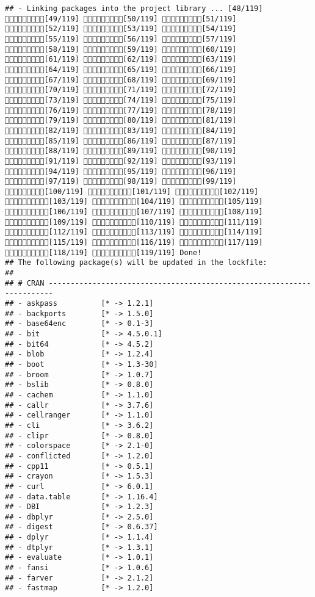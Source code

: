 \documentclass[
]{article}
\begin{document}
\begin{verbatim}
## - Linking packages into the project library ... [48/119] [49/119] [50/119] [51/119] [52/119] [53/119] [54/119] [55/119] [56/119] [57/119] [58/119] [59/119] [60/119] [61/119] [62/119] [63/119] [64/119] [65/119] [66/119] [67/119] [68/119] [69/119] [70/119] [71/119] [72/119] [73/119] [74/119] [75/119] [76/119] [77/119] [78/119] [79/119] [80/119] [81/119] [82/119] [83/119] [84/119] [85/119] [86/119] [87/119] [88/119] [89/119] [90/119] [91/119] [92/119] [93/119] [94/119] [95/119] [96/119] [97/119] [98/119] [99/119] [100/119] [101/119] [102/119] [103/119] [104/119] [105/119] [106/119] [107/119] [108/119] [109/119] [110/119] [111/119] [112/119] [113/119] [114/119] [115/119] [116/119] [117/119] [118/119] [119/119] Done!
## The following package(s) will be updated in the lockfile:
## 
## # CRAN -----------------------------------------------------------------------
## - askpass          [* -> 1.2.1]
## - backports        [* -> 1.5.0]
## - base64enc        [* -> 0.1-3]
## - bit              [* -> 4.5.0.1]
## - bit64            [* -> 4.5.2]
## - blob             [* -> 1.2.4]
## - boot             [* -> 1.3-30]
## - broom            [* -> 1.0.7]
## - bslib            [* -> 0.8.0]
## - cachem           [* -> 1.1.0]
## - callr            [* -> 3.7.6]
## - cellranger       [* -> 1.1.0]
## - cli              [* -> 3.6.2]
## - clipr            [* -> 0.8.0]
## - colorspace       [* -> 2.1-0]
## - conflicted       [* -> 1.2.0]
## - cpp11            [* -> 0.5.1]
## - crayon           [* -> 1.5.3]
## - curl             [* -> 6.0.1]
## - data.table       [* -> 1.16.4]
## - DBI              [* -> 1.2.3]
## - dbplyr           [* -> 2.5.0]
## - digest           [* -> 0.6.37]
## - dplyr            [* -> 1.1.4]
## - dtplyr           [* -> 1.3.1]
## - evaluate         [* -> 1.0.1]
## - fansi            [* -> 1.0.6]
## - farver           [* -> 2.1.2]
## - fastmap          [* -> 1.2.0]

\end{verbatim}
\end{document}
